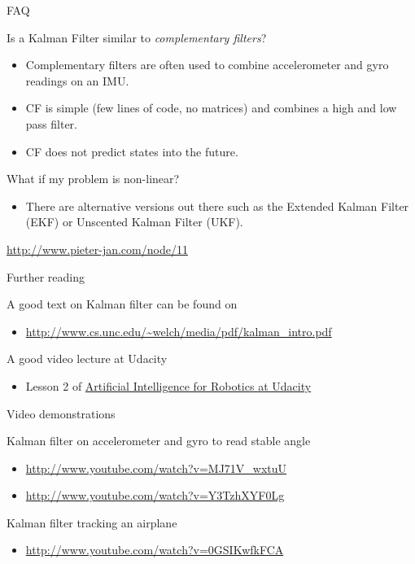\documentclass[compress]{beamer}
\providecommand{\tightlist}{%
  \setlength{\itemsep}{0pt}\setlength{\parskip}{0pt}}
\begin{document}
\begin{frame}{FAQ}

Is a Kalman Filter similar to \emph{complementary filters}?

\begin{itemize}
\tightlist
\item
  Complementary filters are often used to combine accelerometer and gyro
  readings on an IMU.
\item
  CF is simple (few lines of code, no matrices) and combines a high and
  low pass filter.
\item
  CF does not predict states into the future.
\end{itemize}

What if my problem is non-linear?

\begin{itemize}
\tightlist
\item
  There are alternative versions out there such as the Extended Kalman
  Filter (EKF) or Unscented Kalman Filter (UKF).
\end{itemize}

\url{http://www.pieter-jan.com/node/11}

\end{frame}

\begin{frame}{Further reading}

A good text on Kalman filter can be found on

\begin{itemize}
\tightlist
\item
  \url{http://www.cs.unc.edu/~welch/media/pdf/kalman_intro.pdf}
\end{itemize}

A good video lecture at Udacity

\begin{itemize}
\tightlist
\item
  Lesson 2 of \href{https://www.udacity.com/course/cs373}{Artificial
  Intelligence for Robotics at Udacity}
\end{itemize}

Video demonstrations

Kalman filter on accelerometer and gyro to read stable angle

\begin{itemize}
\tightlist
\item
  \url{http://www.youtube.com/watch?v=MJ71V_wxtuU}
\item
  \url{http://www.youtube.com/watch?v=Y3TzhXYF0Lg}
\end{itemize}

Kalman filter tracking an airplane

\begin{itemize}
\tightlist
\item
  \url{http://www.youtube.com/watch?v=0GSIKwfkFCA}
\end{itemize}

\end{frame}
\end{document}
